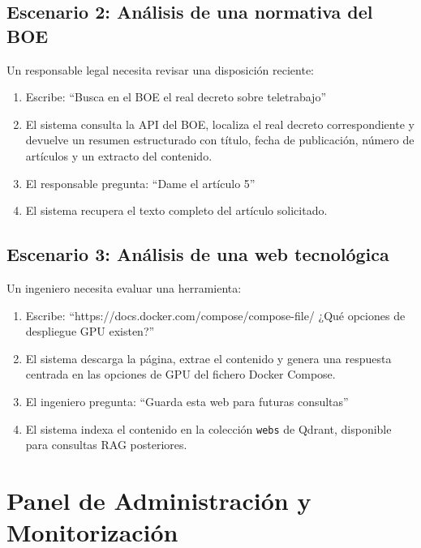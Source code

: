 \subsection{Escenario 2: Análisis de una normativa del BOE}

Un responsable legal necesita revisar una disposición reciente:

\begin{enumerate}
    \item Escribe: ``Busca en el BOE el real decreto sobre teletrabajo''
    \item El sistema consulta la API del BOE, localiza el real decreto correspondiente y devuelve un resumen estructurado con título, fecha de publicación, número de artículos y un extracto del contenido.
    \item El responsable pregunta: ``Dame el artículo 5''
    \item El sistema recupera el texto completo del artículo solicitado.
\end{enumerate}

\subsection{Escenario 3: Análisis de una web tecnológica}

Un ingeniero necesita evaluar una herramienta:

\begin{enumerate}
    \item Escribe: ``https://docs.docker.com/compose/compose-file/ ¿Qué opciones de despliegue GPU existen?''
    \item El sistema descarga la página, extrae el contenido y genera una respuesta centrada en las opciones de GPU del fichero Docker Compose.
    \item El ingeniero pregunta: ``Guarda esta web para futuras consultas''
    \item El sistema indexa el contenido en la colección \texttt{webs} de Qdrant, disponible para consultas RAG posteriores.
\end{enumerate}

\section{Panel de Administración y Monitorización}
\label{sec:admin}

